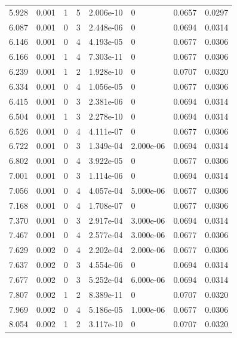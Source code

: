 \documentclass[preview]{standalone}
\begin{document}
{{{\begin{tabular}{L{1.2cm}C{1.2cm} C{0.3cm}C{0.5cm} C{1.4cm}C{1.4cm} C{1.4cm}C{1.4cm}}
  5.928  &  0.001  & 1     &  5 &  2.006e-10  & 0  & 0.0657 &  0.0297   \\ 
  6.087  &  0.001  & 0     &  3 &  2.448e-06  & 0  & 0.0694 &  0.0314   \\ 
  6.146  &  0.001  & 0     &  4 &  4.193e-05  & 0  & 0.0677 &  0.0306   \\ 
  6.166  &  0.001  & 1     &  4 &  7.303e-11  & 0  & 0.0677 &  0.0306   \\ 
  6.239  &  0.001  & 1     &  2 &  1.928e-10  & 0  & 0.0707 &  0.0320   \\ 
  6.334  &  0.001  & 0     &  4 &  1.056e-05  & 0  & 0.0677 &  0.0306   \\ 
  6.415  &  0.001  & 0     &  3 &  2.381e-06  & 0  & 0.0694 &  0.0314   \\ 
  6.504  &  0.001  & 1     &  3 &  2.278e-10  & 0  & 0.0694 &  0.0314   \\ 
  6.526  &  0.001  & 0     &  4 &  4.111e-07  & 0  & 0.0677 &  0.0306   \\ 
  6.722  &  0.001  & 0     &  3 &  1.349e-04  & 2.000e-06  & 0.0694 &  0.0314   \\ 
  6.802  &  0.001  & 0     &  4 &  3.922e-05  & 0  & 0.0677 &  0.0306   \\ 
  7.001  &  0.001  & 0     &  3 &  1.114e-06  & 0  & 0.0694 &  0.0314   \\ 
  7.056  &  0.001  & 0     &  4 &  4.057e-04  & 5.000e-06  & 0.0677 &  0.0306   \\ 
  7.168  &  0.001  & 0     &  4 &  1.708e-07  & 0  & 0.0677 &  0.0306   \\ 
  7.370  &  0.001  & 0     &  3 &  2.917e-04  & 3.000e-06  & 0.0694 &  0.0314   \\ 
  7.467  &  0.001  & 0     &  4 &  2.577e-04  & 3.000e-06  & 0.0677 &  0.0306   \\ 
  7.629  &  0.002  & 0     &  4 &  2.202e-04  & 2.000e-06  & 0.0677 &  0.0306   \\ 
  7.637  &  0.002  & 0     &  3 &  4.554e-06  & 0  & 0.0694 &  0.0314   \\ 
  7.677  &  0.002  & 0     &  3 &  5.252e-04  & 6.000e-06  & 0.0694 &  0.0314   \\ 
  7.807  &  0.002  & 1     &  2 &  8.389e-11  & 0  & 0.0707 &  0.0320   \\ 
  7.969  &  0.002  & 0     &  4 &  5.186e-05  & 1.000e-06  & 0.0677 &  0.0306   \\ 
  8.054  &  0.002  & 1     &  2 &  3.117e-10  & 0  & 0.0707 &  0.0320   \\ 

\end{tabular}}}}
\end{document}
